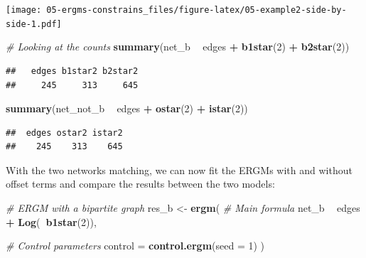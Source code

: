 \documentclass[]{book}
\newenvironment{Shaded}{\begin{snugshade}}{\end{snugshade}}
\newcommand{\CommentTok}[1]{\textcolor[rgb]{0.56,0.35,0.01}{\textit{#1}}}
\newcommand{\DataTypeTok}[1]{\textcolor[rgb]{0.13,0.29,0.53}{#1}}
\newcommand{\DecValTok}[1]{\textcolor[rgb]{0.00,0.00,0.81}{#1}}
\newcommand{\KeywordTok}[1]{\textcolor[rgb]{0.13,0.29,0.53}{\textbf{#1}}}
\newcommand{\NormalTok}[1]{#1}
\newcommand{\OperatorTok}[1]{\textcolor[rgb]{0.81,0.36,0.00}{\textbf{#1}}}
\newcommand{\StringTok}[1]{\textcolor[rgb]{0.31,0.60,0.02}{#1}}
\begin{document}
\texttt{[image: 05-ergms-constrains\_files/figure-latex/05-example2-side-by-side-1.pdf]}

\begin{Shaded}
\begin{Highlighting}[]
\CommentTok{# Looking at the counts}
\KeywordTok{summary}\NormalTok{(net_b }\OperatorTok{~}\StringTok{ }\NormalTok{edges }\OperatorTok{+}\StringTok{ }\KeywordTok{b1star}\NormalTok{(}\DecValTok{2}\NormalTok{) }\OperatorTok{+}\StringTok{ }\KeywordTok{b2star}\NormalTok{(}\DecValTok{2}\NormalTok{))}
\end{Highlighting}
\end{Shaded}

\begin{verbatim}
##   edges b1star2 b2star2 
##     245     313     645
\end{verbatim}

\begin{Shaded}
\begin{Highlighting}[]
\KeywordTok{summary}\NormalTok{(net_not_b }\OperatorTok{~}\StringTok{ }\NormalTok{edges }\OperatorTok{+}\StringTok{ }\KeywordTok{ostar}\NormalTok{(}\DecValTok{2}\NormalTok{) }\OperatorTok{+}\StringTok{ }\KeywordTok{istar}\NormalTok{(}\DecValTok{2}\NormalTok{))}
\end{Highlighting}
\end{Shaded}

\begin{verbatim}
##  edges ostar2 istar2 
##    245    313    645
\end{verbatim}

With the two networks matching, we can now fit the ERGMs with and without
offset terms and compare the results between the two models:

\begin{Shaded}
\begin{Highlighting}[]
\CommentTok{# ERGM with a bipartite graph}
\NormalTok{res_b     <-}\StringTok{ }\KeywordTok{ergm}\NormalTok{(}
  \CommentTok{# Main formula}
\NormalTok{  net_b }\OperatorTok{~}\StringTok{ }\NormalTok{edges }\OperatorTok{+}\StringTok{ }\KeywordTok{Log}\NormalTok{(}\OperatorTok{~}\KeywordTok{b1star}\NormalTok{(}\DecValTok{2}\NormalTok{)),}

  \CommentTok{# Control parameters}
  \DataTypeTok{control =} \KeywordTok{control.ergm}\NormalTok{(}\DataTypeTok{seed =} \DecValTok{1}\NormalTok{)}
\NormalTok{  )}
\end{Highlighting}
\end{Shaded}
\end{document}
